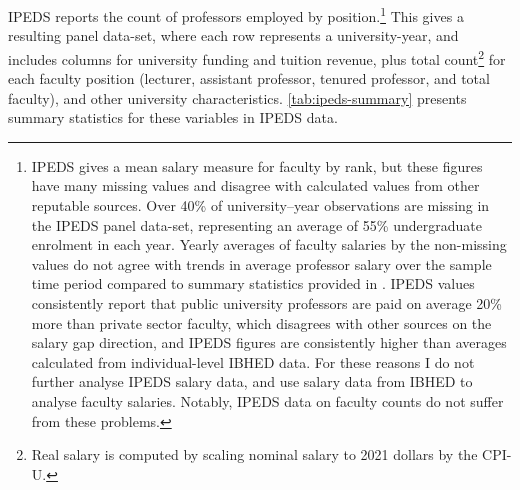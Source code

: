 IPEDS reports the count of professors employed by position.\footnote{
    IPEDS gives a mean salary measure for faculty by rank, but these figures have many missing values and disagree with calculated values from other reputable sources.
    Over 40\% of university--year observations are missing in the IPEDS panel data-set, representing an average of 55\% undergraduate enrolment in each year.
    Yearly averages of faculty salaries by the non-missing values do not agree with trends in average professor salary over the sample time period compared to summary statistics provided in \cite{aau2021survey}.
    IPEDS values consistently report that public university professors are paid on average 20\% more than private sector faculty, which disagrees with other sources on the salary gap direction, and IPEDS figures are consistently higher than averages calculated from individual-level IBHED data.
    For these reasons I do not further analyse IPEDS salary data, and use salary data from IBHED to analyse faculty salaries.
    Notably, IPEDS data on faculty counts do not suffer from these problems.
}
This gives a resulting panel data-set, where each row represents a university-year, and includes columns for university funding and tuition revenue, plus total count\footnote{
    Real salary is computed by scaling nominal salary to 2021 dollars by the CPI-U.
} for each faculty position (lecturer, assistant professor, tenured professor, and total faculty), and other university characteristics.
\autoref{tab:ipeds-summary} presents summary statistics for these variables in IPEDS data.

